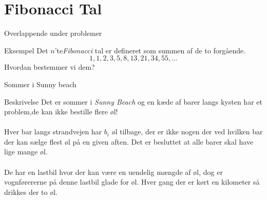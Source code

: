 \documentclass[12pt,t]{beamer}
\begin{document}
\section{Fibonacci Tal}
    \begin{frame}[c]{Overlappende under problemer}
        \begin{block}{Eksempel}
            Det $n$'te\emph{Fibonacci} tal er defineret som summen af de to
            forgående.
            $$
              1,1,2,3,5,8,13,21,34,55, \dots
            $$
            \pause
            Hvordan bestemmer vi dem?
        \end{block}
    \end{frame}

    \begin{frame}[c]{Sommer i Sunny beach}
        \begin{block}{Beskrivelse}
          Det er sommer i \emph{Sunny Beach} og en kæde af barer langs kysten
          har et problem,\pause  de kan ikke bestille flere øl!
          \\
          \pause  ~ \\
          Hver bar langs strandvejen har $b_i$ øl tilbage, der er ikke
          nogen der ved hvilken bar der kan sælge flest øl på en given aften.
          \pause
          Det er besluttet at alle barer skal have lige mange øl. \\
          \pause
          ~\\
          De har en lastbil hvor der kan være en uendelig mængde af øl, \pause
          dog er vognførererne på denne lastbil glade for øl. Hver gang der er
          kørt en kilometer så drikkes der to øl.
        \end{block}
    \end{frame}
\end{document}
